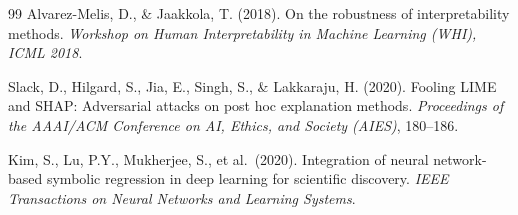 \documentclass[10pt,twocolumn]{article}
\begin{document}
\begin{thebibliography}{99}
Alvarez-Melis, D., \& Jaakkola, T. (2018).
On the robustness of interpretability methods.
\textit{Workshop on Human Interpretability in Machine Learning (WHI),
ICML 2018}.

Slack, D., Hilgard, S., Jia, E., Singh, S., \& Lakkaraju, H. (2020).
Fooling LIME and SHAP: Adversarial attacks on post hoc explanation methods.
\textit{Proceedings of the AAAI/ACM Conference on AI, Ethics, and Society
(AIES)}, 180--186.

Kim, S., Lu, P.Y., Mukherjee, S., et al.\ (2020).
Integration of neural network-based symbolic regression in deep learning for
scientific discovery.
\textit{IEEE Transactions on Neural Networks and Learning Systems}.

\end{thebibliography}
\end{document}

